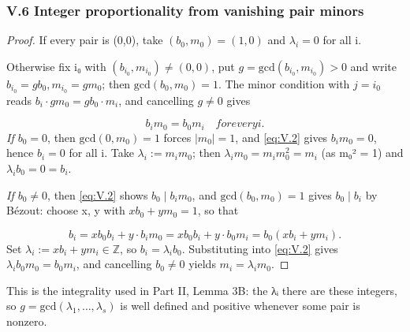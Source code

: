 \subsubsection*{V.6 Integer proportionality from vanishing pair minors}
\begin{proof}
If every pair is (0,0), take $(b_{0}, m_{0}) = (1, 0)$ and $λ_{i} = 0$ for all i.

Otherwise fix i₀ with $(b_{i_{0}}, m_{i_{0}}) ≠ (0,0)$, put $g = \mathrm{gcd}(b_{i_{0}}, m_{i_{0}}) > 0$ and write $b_{i_{0}} = g b_{0}, m_{i_{0}} = g m_{0}$; then $\mathrm{gcd}(b_{0}, m_{0}) = 1$. The minor condition with $j = i_{0}$ reads $b_{i}·g m_{0} = g b_{0}·m_{i}$, and cancelling $g ≠ 0$ gives

\begin{equation}\tag{V.2}\label{eq:V.2}
b_{i} m_{0} = b_{0} m_{i} \quad for every i.
\end{equation}
\emph{If $b_{0} = 0$}, then $\mathrm{gcd}(0, m_{0}) = 1$ forces $|m_{0}| = 1$, and \eqref{eq:V.2} gives $b_{i} m_{0} = 0$, hence $b_{i} = 0$ for all i. Take $λ_{i} := m_{i} m_{0}$; then $λ_{i} m_{0} = m_{i} m_{0}^{2} = m_{i}$ (as m₀² = 1) and $λ_{i} b_{0} = 0 = b_{i}$.

\emph{If $b_{0} ≠ 0$}, then \eqref{eq:V.2} shows $b_{0} ∣ b_{i} m_{0}$, and $\mathrm{gcd}(b_{0}, m_{0}) = 1$ gives $b_{0} ∣ b_{i}$ by Bézout: choose x, y with $x b_{0} + y m_{0} = 1$, so that

\[
b_{i} = x b_{0} b_{i} + y·b_{i} m_{0} = x b_{0} b_{i} + y·b_{0} m_{i} = b_{0}(x b_{i} + y m_{i}).
\]
Set $λ_{i} := x b_{i} + y m_{i} ∈ ℤ$, so $b_{i} = λ_{i} b_{0}$. Substituting into \eqref{eq:V.2} gives $λ_{i} b_{0} m_{0} = b_{0} m_{i}$, and cancelling $b_{0} ≠ 0$ yields $m_{i} = λ_{i} m_{0}$.

\end{proof}
This is the integrality used in Part II, Lemma 3B: the λᵢ there are these integers, so $g = \mathrm{gcd}(λ_{1}, …, λ_{s})$ is well defined and positive whenever some pair is nonzero.

